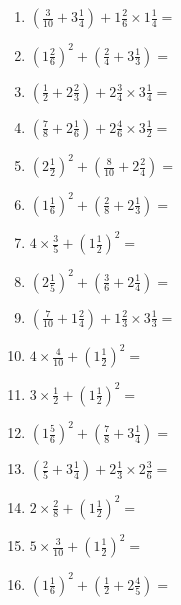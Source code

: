 \documentclass[12pt]{article}
\begin{document}
\begin{enumerate}
\newpage
\item \large $ (\frac{3}{10} + 3 \frac{1}{4}) + 1 \frac{2}{6} \times 1 \frac{1}{4} = $ \vspace{1.8cm}
\item \large $ (1 \frac{2}{6})^2 + (\frac{2}{4} + 3 \frac{1}{3}) = $ \vspace{1.8cm}
\item \large $ (\frac{1}{2} + 2 \frac{2}{3}) + 2 \frac{3}{4} \times 3 \frac{1}{4} = $ \vspace{1.8cm}
\item \large $ (\frac{7}{8} + 2 \frac{1}{6}) + 2 \frac{4}{6} \times 3 \frac{1}{2} = $ \vspace{1.8cm}
\item \large $ (2 \frac{1}{2})^2 + (\frac{8}{10} + 2 \frac{2}{4}) = $ \vspace{1.8cm}
\item \large $ (1 \frac{1}{6})^2 + (\frac{2}{8} + 2 \frac{1}{3}) = $ \vspace{1.8cm}
\item \large $ 4 \times \frac{3}{5} + (1 \frac{1}{2})^2 = $ \vspace{1.8cm}
\item \large $ (2 \frac{1}{5})^2 + (\frac{3}{6} + 2 \frac{1}{4}) = $ \vspace{1.8cm}
\item \large $ (\frac{7}{10} + 1 \frac{2}{4}) + 1 \frac{2}{3} \times 3 \frac{1}{3} = $ \vspace{1.8cm}
\item \large $ 4 \times \frac{4}{10} + (1 \frac{1}{2})^2 = $ \vspace{1.8cm}
\newpage
\item \large $ 3 \times \frac{1}{2} + (1 \frac{1}{2})^2 = $ \vspace{1.8cm}
\item \large $ (1 \frac{5}{6})^2 + (\frac{7}{8} + 3 \frac{1}{4}) = $ \vspace{1.8cm}
\item \large $ (\frac{2}{5} + 3 \frac{1}{4}) + 2 \frac{1}{3} \times 2 \frac{3}{6} = $ \vspace{1.8cm}
\item \large $ 2 \times \frac{2}{8} + (1 \frac{1}{2})^2 = $ \vspace{1.8cm}
\item \large $ 5 \times \frac{3}{10} + (1 \frac{1}{2})^2 = $ \vspace{1.8cm}
\item \large $ (1 \frac{1}{6})^2 + (\frac{1}{2} + 2 \frac{4}{5}) = $ \vspace{1.8cm}

\end{enumerate}
\end{document}
